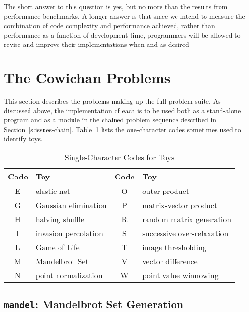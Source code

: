 \vspace{\baselineskip}


The short answer to this question is yes,
but no more than the results from performance benchmarks.
A longer answer is that	since we intend to measure the combination of code complexity and performance achieved,
rather than performance as a function of development time,
programmers will be allowed to revise and improve their implementations when and as desired.

\section{The Cowichan Problems\label{s:toys}}

This section describes the problems making up the full problem suite.
As discussed above,
the implementation of each is to be used both as a stand-alone program
and as a module in the chained problem sequence described in Section~\ref{s:issues-chain}.
Table~\ref{t:toy-codes} lists the one-character codes sometimes used to identify toys.

\begin{table}
\begin{center}
\begin{tabular}{cl|cl}
Code	& Toy				& Code	& Toy				\\
\hline
E	& elastic net			& O	& outer product			\\
G	& Gaussian elimination		& P	& matrix-vector product		\\
H	& halving shuffle		& R	& random matrix generation	\\
I	& invasion percolation		& S	& successive over-relaxation	\\
L	& Game of Life			& T	& image thresholding		\\
M	& Mandelbrot Set		& V	& vector difference		\\
N	& point normalization		& W	& point value winnowing
\end{tabular}
\caption{Single-Character Codes for Toys\label{t:toy-codes}}
\end{center}
\end{table}

\subsection{{\tt{mandel}}:
	Mandelbrot Set Generation
	\label{s:toys-mandel}}

